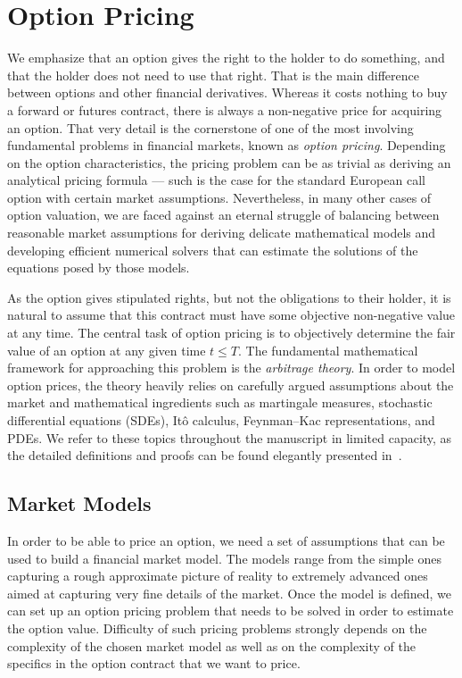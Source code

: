 \documentclass{UUThesisTemplate}
\begin{document}
%
\chapter{Option Pricing}
\label{ch:optionpricing}

\par
We emphasize that an option gives the right to the holder to do something, and that the holder does not need to use that right. That is the main difference between options and other financial derivatives. Whereas it costs nothing to buy a forward or futures contract, there is always a non-negative price for acquiring an option. That very detail is the cornerstone of one of the most involving fundamental problems in financial markets, known as \emph{option pricing}. Depending on the option characteristics, the pricing problem can be as trivial as deriving an analytical pricing formula --- such is the case for the standard European call option with certain market assumptions. Nevertheless, in many other cases of option valuation, we are faced against an eternal struggle of balancing between reasonable market assumptions for deriving delicate mathematical models and developing efficient numerical solvers that can estimate the solutions of the equations posed by those models.

\par
As the option gives stipulated rights, but not the obligations to their holder, it is natural to assume that this contract must have some objective non-negative value at any time. The central task of option pricing is to objectively determine the fair value of an option at any given time $t \leq T$. The fundamental mathematical framework for approaching this problem is the \emph{arbitrage theory}. In order to model option prices, the theory heavily relies on carefully argued assumptions about the market and mathematical ingredients such as martingale measures, stochastic differential equations (SDEs), It\^o calculus, Feynman--Kac representations, and PDEs. We refer to these topics throughout the manuscript in limited capacity, as the detailed definitions and proofs can be found elegantly presented in~\cite{bjork2009arbitrage}.
%





%
\section{Market Models}
\label{sec:models}
\par
In order to be able to price an option, we need a set of assumptions that can be used to build a financial market model. The models range from the simple ones capturing a rough approximate picture of reality to extremely advanced ones aimed at capturing very fine details of the market. Once the model is defined, we can set up an option pricing problem that needs to be solved in order to estimate the option value. Difficulty of such pricing problems strongly depends on the complexity of the chosen market model as well as on the complexity of the specifics in the option contract that we want to price.  
%
\end{document}
